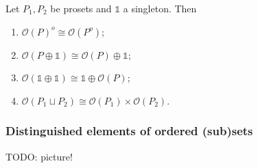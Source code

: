 \begin{lemma}
Let $P_1,P_2$ be prosets and $\mathbb{1}$ a singleton. Then
\begin{enumerate}
\item $\mathcal{O}(P)^o \cong \mathcal{O}(P^o)$;
\item $\mathcal{O}(P\oplus \mathbb{1}) \cong \mathcal{O}(P)\oplus \mathbb{1}$;
\item $\mathcal{O}(\mathbb{1}\oplus \mathbb{1}) \cong \mathbb{1}\oplus \mathcal{O}(P)$;
\item $\mathcal{O}(P_1\sqcup P_2)\cong \mathcal{O}(P_1)\times \mathcal{O}(P_2)$.
\end{enumerate}
\end{lemma}

\subsubsection{Distinguished elements of ordered (sub)sets}
TODO: picture!
